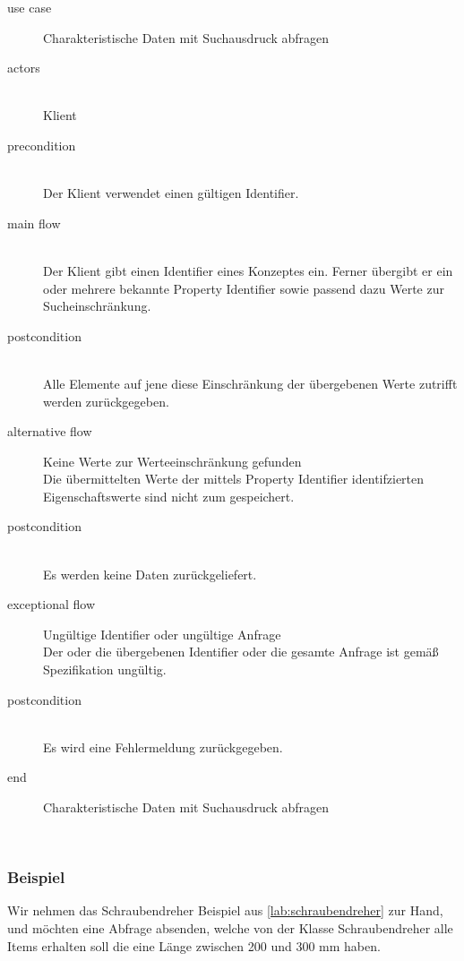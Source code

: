 {\small

\begin{description}
     \item[use case] Charakteristische Daten mit Suchausdruck abfragen
     \item[  actors]~\\
     Klient
     \item[  precondition]~\\
     Der Klient verwendet einen gültigen Identifier.
     \item[  main flow]~\\
     Der Klient gibt einen Identifier eines Konzeptes ein. Ferner übergibt er ein oder mehrere bekannte Property Identifier sowie passend dazu Werte zur Sucheinschränkung. 
     \item[  postcondition]~\\
     Alle Elemente auf jene diese Einschränkung der übergebenen Werte zutrifft werden zurückgegeben.       
     \item[  alternative flow] Keine Werte zur Werteeinschränkung gefunden ~\\
     Die übermittelten Werte der mittels Property Identifier identifzierten Eigenschaftswerte sind nicht zum  gespeichert.
      \item[  postcondition]~\\
     Es werden keine Daten zurückgeliefert.
     \item[  exceptional flow] Ungültige Identifier oder ungültige Anfrage ~\\
     Der oder die übergebenen Identifier oder die gesamte Anfrage ist gemäß Spezifikation ungültig.   
     \item[  postcondition]~\\
     Es wird eine Fehlermeldung zurückgegeben.      
     \item[end] Charakteristische Daten mit Suchausdruck abfragen
\end{description}

~\\

} %

\subsubsection{Beispiel}

Wir nehmen das Schraubendreher Beispiel aus \autoref{lab:schraubendreher} zur Hand, und möchten eine Abfrage absenden, welche von der Klasse Schraubendreher alle Items erhalten soll die eine Länge zwischen 200 und 300 mm haben. 


